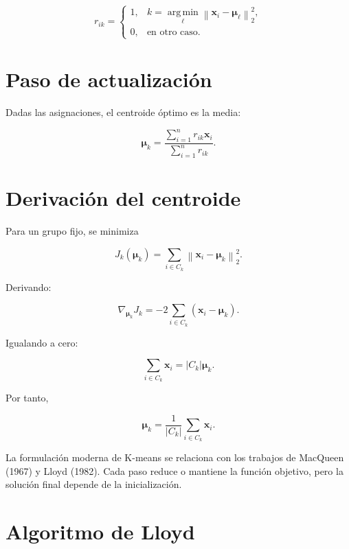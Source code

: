 \documentclass[
  spanish,
  10.5pt,
  letterpaper,
  DIV=11,
  numbers=noendperiod,
  oneside,
  open=any]{scrreprt}
\theoremstyle{definition}
\theoremstyle{definition}
\theoremstyle{plain}
\theoremstyle{remark}
\begin{document}
\[
r_{ik}
=
\begin{cases}
1, &
k=
\operatorname*{arg\,min}_{\ell}
\left\|
\mathbf{x}_i-\boldsymbol{\mu}_{\ell}
\right\|_2^2,\\
0, & \text{en otro caso}.
\end{cases}
\]

\section*{Paso de actualización}\label{paso-de-actualizaciuxf3n}


Dadas las asignaciones, el centroide óptimo es la media:

\[
\boldsymbol{\mu}_k
=
\frac{
\sum_{i=1}^{n}
r_{ik}\mathbf{x}_i
}{
\sum_{i=1}^{n}r_{ik}
}.
\]

\section*{Derivación del centroide}\label{derivaciuxf3n-del-centroide}


Para un grupo fijo, se minimiza

\[
J_k(\boldsymbol{\mu}_k)
=
\sum_{i\in C_k}
\left\|
\mathbf{x}_i-\boldsymbol{\mu}_k
\right\|_2^2.
\]

Derivando:

\[
\nabla_{\boldsymbol{\mu}_k}J_k
=
-2
\sum_{i\in C_k}
\left(
\mathbf{x}_i-\boldsymbol{\mu}_k
\right).
\]

Igualando a cero:

\[
\sum_{i\in C_k}\mathbf{x}_i
=
|C_k|\boldsymbol{\mu}_k.
\]

Por tanto,

\[
\boldsymbol{\mu}_k
=
\frac{1}{|C_k|}
\sum_{i\in C_k}\mathbf{x}_i.
\]

La formulación moderna de K-means se relaciona con los trabajos de
MacQueen (1967) y Lloyd (1982). Cada paso reduce o mantiene la función
objetivo, pero la solución final depende de la inicialización.

\section*{Algoritmo de Lloyd}\label{algoritmo-de-lloyd}
\end{document}
